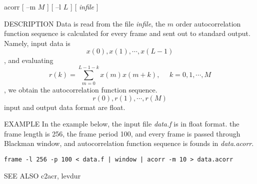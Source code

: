 
\begin{synopsis}
 \item[ acorr ] [ --m $M$ ] [ --l $L$ ] [ {\em infile} ]
\end{synopsis}

\begin{qsection}{DESCRIPTION}
 Data is read from the file {\em infile}, the $m$ order autocorrelation
 function sequence is calculated for every frame and sent out to standard
 output. Namely, input data is
\[ x(0),x(1),\cdots,x(L-1) \],
 and evaluating 
\[ r(k)=\sum_{m=0}^{L-1-k}x(m)x(m+k),~~~~~~k=0,1,\cdots,M \],
 we obtain the autocorrelation function sequence.
\[ r(0),r(1),\cdots,r(M) \]
 input and output data format are float.
\end{qsection}

\begin{options}
\end{options}

\begin{qsection}{EXAMPLE}
In the example below, the input file {\em data.f} is in float format.
the frame length is 256, the frame period 100, and every frame is
passed through Blackman window, and autocorrelation function sequence
is founds in {\em data.acorr}.
\begin{center}
 \verb!frame -l 256 -p 100 < data.f | window | acorr -m 10 > data.acorr!
\end{center}
\end{qsection}

\begin{qsection}{SEE ALSO}
 c2acr, levdur
\end{qsection}

